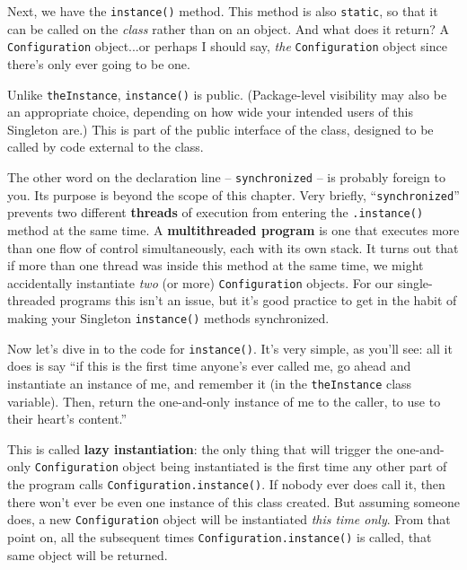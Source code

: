 Next, we have the \texttt{instance()} method. This method is also
\texttt{static}, so that it can be called on the \textit{class} rather than on
an object. And what does it return? A \texttt{Configuration} object...or
perhaps I should say, \textit{the} \texttt{Configuration} object since there's
only ever going to be one.


Unlike \texttt{theInstance}, \texttt{instance()} is public. (Package-level
visibility may also be an appropriate choice, depending on how wide your
intended users of this Singleton are.) This is part of the public interface of
the class, designed to be called by code external to the class.


The other word on the declaration line -- \texttt{synchronized} -- is probably
foreign to you. Its purpose is beyond the scope of this chapter. Very briefly,
``\texttt{synchronized}'' prevents two different \textbf{threads} of execution
from entering the \texttt{.instance()} method at the same time. A
\textbf{multithreaded program} is one that executes more than one flow of
control simultaneously, each with its own stack. It turns out that if more than
one thread was inside this method at the same time, we might accidentally
instantiate \textit{two} (or more) \texttt{Configuration} objects. For our
single-threaded programs this isn't an issue, but it's good practice to get in
the habit of making your Singleton \texttt{instance()} methods synchronized.

Now let's dive in to the code for \texttt{instance()}. It's very simple, as
you'll see: all it does is say ``if this is the first time anyone's ever
called me, go ahead and instantiate an instance of me, and remember it (in the
\texttt{theInstance} class variable). Then, return the one-and-only instance
of me to the caller, to use to their heart's content.''

This is called \textbf{lazy instantiation}: the only thing that will trigger
the one-and-only \texttt{Configuration} object being instantiated is the first
time any other part of the program calls \texttt{Configuration.instance()}. If
nobody ever does call it, then there won't ever be even one instance of this
class created. But assuming someone does, a new \texttt{Configuration} object
will be instantiated \textit{this time only}. From that point on, all the
subsequent times \texttt{Configuration.instance()} is called, that same object
will be returned.

